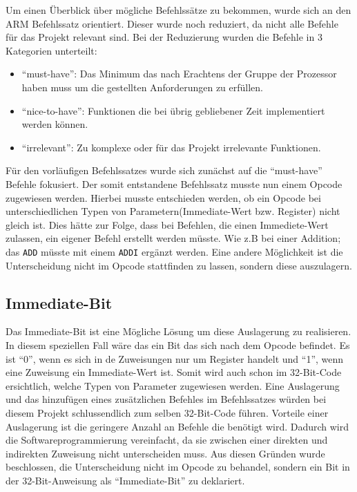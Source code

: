 \documentclass[paper=a4,fontsize=12pt,twocolumn]{scrreprt}
\begin{document}
Um einen Überblick über mögliche Befehlssätze zu bekommen, wurde sich an den ARM Befehlssatz orientiert\footnotemark.
Dieser wurde noch reduziert, da nicht alle Befehle für das Projekt relevant sind.
Bei der Reduzierung wurden die Befehle in 3 Kategorien unterteilt:
\begin{itemize}
    \item \enquote{must-have}:
    Das Minimum das nach Erachtens der Gruppe der Prozessor haben muss um die gestellten Anforderungen zu erfüllen.
    \item \enquote{nice-to-have}:
    Funktionen die bei übrig gebliebener Zeit implementiert werden können.
    \item \enquote{irrelevant}:
    Zu komplexe oder für das Projekt irrelevante Funktionen.
\end{itemize}
Für den vorläufigen Befehlssatzes wurde sich zunächst auf die \enquote{must-have} Befehle fokusiert. 
Der somit entstandene Befehlssatz musste nun einem Opcode zugewiesen werden. Hierbei musste entschieden werden, ob ein Opcode bei unterschiedlichen Typen von Parametern(Immediate-Wert bzw. Register) nicht gleich ist. Dies hätte zur Folge, dass bei Befehlen, die einen Immediete-Wert zulassen, ein eigener Befehl erstellt werden müsste. Wie z.B bei einer Addition; das \texttt{ADD} müsste mit einem \texttt{ADDI} ergänzt werden. Eine andere Möglichkeit ist die Unterscheidung nicht im Opcode stattfinden zu lassen, sondern diese auszulagern.


\subsection{Immediate-Bit}

Das Immediate-Bit ist eine Mögliche Lösung um diese Auslagerung zu realisieren. In diesem speziellen Fall wäre das ein Bit das sich nach dem Opcode befindet. Es ist \enquote{0}, wenn es sich in de Zuweisungen nur um Register handelt und \enquote{1}, wenn eine Zuweisung ein Immediate-Wert ist. Somit wird auch schon im 32-Bit-Code ersichtlich, welche Typen von Parameter zugewiesen werden.
Eine Auslagerung und das hinzufügen eines zusätzlichen Befehles im Befehlssatzes würden bei diesem Projekt schlussendlich zum selben 32-Bit-Code führen.
Vorteile einer Auslagerung ist die geringere Anzahl an Befehle die benötigt wird.
Dadurch wird die Softwareprogrammierung vereinfacht, da sie zwischen einer direkten und indirekten Zuweisung nicht unterscheiden muss.
Aus diesen Gründen wurde beschlossen, die Unterscheidung nicht im Opcode zu behandel, sondern ein Bit in der 32-Bit-Anweisung als \enquote{Immediate-Bit} zu deklariert.
\end{document}

